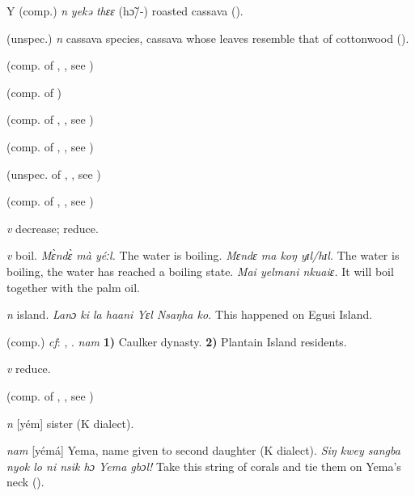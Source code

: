 \begin{letter}{Y}
 (comp.) \textit{n} \textit{yekə thɛɛ} (hɔ̃/-) roasted cassava (\citealt{Pichl1967}). 

 (unspec.) \textit{n} cassava species, cassava whose leaves resemble that of cottonwood (\citealt{Pichl1967}). 

 (comp. of , , see ) 

 (comp. of ) 

 (comp. of , , see ) 

 (comp. of , , see ) 

 (unspec. of , , see ) 

 (comp. of , , see ) 

 \textit{v} decrease; reduce.

 \textit{v} boil. \textit{Mɛ̀ndɛ̀ mà yéːl.} The water is boiling. \textit{Mɛndɛ ma koŋ yɪl/hɪl.} The water is boiling, the water has reached a boiling state. \textit{Mai yelmani nkuaiɛ.} It will boil together with the palm oil.

 \textit{n} island. \textit{Lanɔ ki la haani Yɛl Nsaŋha ko.} This happened on Egusi Island.

 (comp.) \textit{cf}: , . \textit{nam} \textbf{1)} Caulker dynasty. \textbf{2)} Plantain Island residents.

 \textit{v} reduce.

 (comp. of , , see ) 

 \textit{n} [yém] sister (K dialect). 

 \textit{nam} [yémá] Yema, name given to second daughter (K dialect). \textit{Siŋ kwey sangba nyok lo ni nsik hɔ Yema gbɔl!} Take this string of corals and tie them on Yema's neck (\citealt{Pichl1967}). 


\end{letter}
